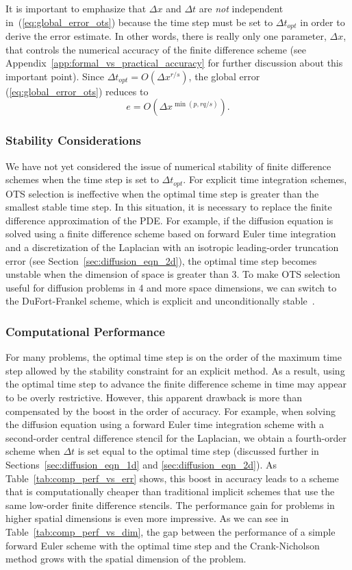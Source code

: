 \documentclass[fleqn,12pt,twoside]{article}
\newcommand{\beq}{\begin{equation}}
\newcommand{\eeq}{\end{equation}}
\def\dt{\Delta t}
\def\dx{\Delta x}
\def\dto{\dt_{opt}}
\begin{document}
It is important to emphasize that $\dx$ and $\dt$ are \emph{not} independent 
in~(\ref{eq:global_error_ots}) because the time step must be set to $\dto$ 
in order to derive the error estimate.  In other words, there is really only 
one parameter, $\dx$, that controls the numerical accuracy of the finite 
difference scheme (see Appendix~\ref{app:formal_vs_practical_accuracy} for 
further discussion about this important point).  Since $\dto = O(\dx^{r/s})$, 
the global error (\ref{eq:global_error_ots}) reduces to
\beq
e = O \left( \dx^{\min(p,rq/s)} \right).
\label{eq:global_error_ots_simplified}
\eeq


\subsubsection*{Stability Considerations}
We have not yet considered the issue of numerical stability of finite
difference schemes when the time step is set to $\dto$.  For explicit time 
integration schemes, OTS selection is ineffective when the optimal time step 
is greater than the smallest stable time step.  In this situation, it is 
necessary to replace the finite difference approximation of the PDE.  
For example, if the diffusion equation is solved using a 
finite difference scheme based on forward Euler time integration and a 
discretization of the Laplacian with an isotropic leading-order truncation 
error (see Section~\ref{sec:diffusion_eqn_2d}), the optimal time step becomes 
unstable when the dimension of space is greater than 3.  To make OTS selection 
useful for diffusion problems in 4 and more space dimensions, we can switch 
to the DuFort-Frankel scheme, which is explicit and unconditionally 
stable~\cite{gko_book}.


\subsubsection*{\label{sec:computational_performance} 
                Computational Performance}
For many problems, the optimal time step is on the order of the maximum 
time step allowed by the stability constraint for an explicit method.  
As a result, using the optimal time step to advance the finite
difference scheme in time may appear to be overly restrictive.
However, this apparent drawback is more than 
compensated by the boost in the order of accuracy.  For example, when solving 
the diffusion equation using a forward Euler time integration scheme with a 
second-order central difference stencil for the Laplacian, we obtain a 
fourth-order scheme when $\dt$ is set equal to the optimal time step 
(discussed further in Sections~\ref{sec:diffusion_eqn_1d} and
\ref{sec:diffusion_eqn_2d}).  
As Table~\ref{tab:comp_perf_vs_err} shows, this boost in accuracy leads to a
scheme that is computationally cheaper than traditional implicit schemes that
use the same low-order finite difference stencils.  The performance gain for 
problems in higher spatial dimensions is even more impressive.  As we can see 
in Table~\ref{tab:comp_perf_vs_dim}, the gap between the performance of a
simple forward Euler scheme with the optimal time step and the Crank-Nicholson
method grows with the spatial dimension of the problem.  
\end{document}
